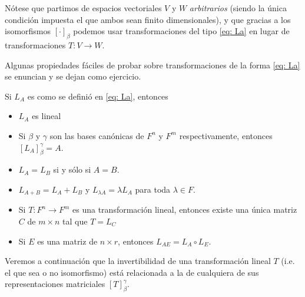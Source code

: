 Nótese que partimos de espacios vectoriales $V$ y $W$ \textit{arbitrarios}
(siendo la única condición impuesta el que ambos sean finito dimensionales),
y que gracias a los isomorfismos $[\cdot]_{\beta}$ podemos 
usar transformaciones del tipo \eqref{eq: La} en lugar
de transformaciones $T: V \longrightarrow W$.

Algunas propiedades fáciles de probar sobre transformaciones
de la forma \eqref{eq: La} se enuncian y se dejan como ejercicio.
\begin{prop}
Si $L_{A}$ es como se definió en \eqref{eq: La}, entonces
\begin{itemize}
	\item $L_{A}$ es lineal
	\item Si $\beta$ y $\gamma$ son las bases canónicas de
	$F^{n}$ y $F^{m}$ respectivamente, entonces $[L_{A}]_{\beta}^{\gamma} = A$.
	\item $L_{A} = L_{B}$ si y sólo si $A = B$.
	\item $L_{A + B} = L_{A} + L_{B}$ y $L_{\lambda A} = \lambda L_{A}$
	para toda $\lambda \in F$.
	\item Si $T: F^{n} \longrightarrow F^{m}$ es una transformación lineal,
	entonces existe una única matriz $C$ de $m \times n$ tal que 
	$T = L_{C}$
	\item Si $E$ es una matriz de $n \times r$, entonces
	$L_{AE} = L_{A} \circ L_{E}$.
\end{itemize} 
\end{prop}

Veremos a continuación que la invertibilidad de 
una transformación lineal
$T$ (i.e. el que sea o no isomorfismo) está 
relacionada a la de cualquiera de sus representaciones matriciales
$[T]_{\beta}^{\gamma}$.

